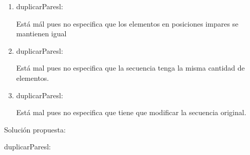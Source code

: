 \begin{enumerate}[label=\alph*)]
      \item \begin{proc}{duplicarPares}{\Inout l: \TLista{\ent}}{}
            \end{proc}

            Está mál pues no especifica que los elementos en posiciones impares se mantienen igual

      \item \begin{proc}{duplicarPares}{\Inout l: \TLista{\ent}}{}
            \end{proc}

            Está mal pues no especifica que la secuencia tenga la misma cantidad de elementos.

      \item \begin{proc}{duplicarPares}{\Inout l: \TLista{\ent}}{\TLista{\ent}}
            \end{proc}

            Está mal pues no especifica que tiene que modificar la secuencia original.
\end{enumerate}

Solución propuesta:

\begin{proc}{duplicarPares}{\Inout l: \TLista{\ent}}{}
\end{proc}


